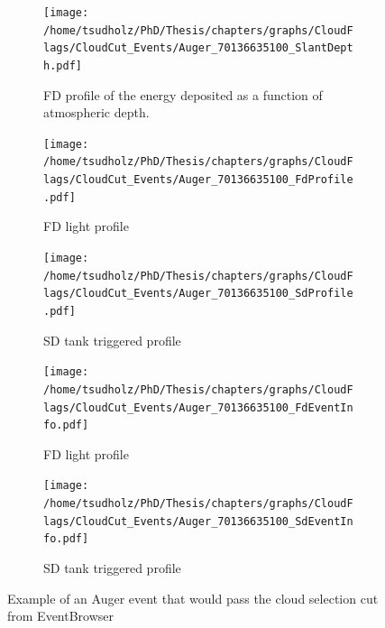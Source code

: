 \begin{figure}[h]
\centering
 \vspace{2cm}
  \begin{subfigure}[b]{\textwidth}
  \centering
  \texttt{[image: /home/tsudholz/PhD/Thesis/chapters/graphs/CloudFlags/CloudCut\_Events/Auger\_70136635100\_SlantDepth.pdf]}
  \caption{FD profile of the energy deposited as a function of atmospheric depth.}
  \end{subfigure}
 \vspace{0.5cm}
  \begin{subfigure}[b]{0.45\textwidth}
  	\centering
  	\texttt{[image: /home/tsudholz/PhD/Thesis/chapters/graphs/CloudFlags/CloudCut\_Events/Auger\_70136635100\_FdProfile.pdf]}
  	\caption{FD light profile}
  \end{subfigure}
  \begin{subfigure}[b]{0.45\textwidth}
  	\centering
  	\texttt{[image: /home/tsudholz/PhD/Thesis/chapters/graphs/CloudFlags/CloudCut\_Events/Auger\_70136635100\_SdProfile.pdf]}
  	\caption{SD tank triggered profile}
  \end{subfigure}

  \begin{subfigure}[b]{0.45\textwidth}
  	\centering
	\texttt{[image: /home/tsudholz/PhD/Thesis/chapters/graphs/CloudFlags/CloudCut\_Events/Auger\_70136635100\_FdEventInfo.pdf]}
  	\caption{FD light profile}
  \end{subfigure}
  \begin{subfigure}[b]{0.45\textwidth}
  	\centering
	\texttt{[image: /home/tsudholz/PhD/Thesis/chapters/graphs/CloudFlags/CloudCut\_Events/Auger\_70136635100\_SdEventInfo.pdf]}
  	\caption{SD tank triggered profile}
  \end{subfigure}
  \caption{Example of an Auger event that would pass the cloud selection cut from EventBrowser}
\end{figure}

